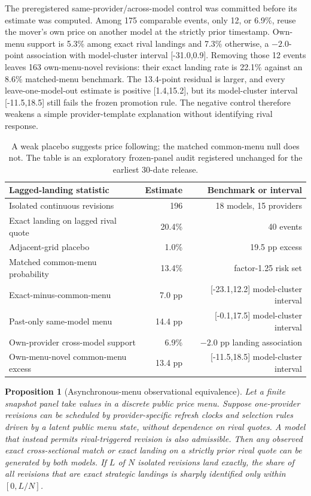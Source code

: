 \documentclass[11pt]{article}
\newcommand{\1}{\mathbf{1}}
\newtheorem{proposition}{Proposition}
\begin{document}
{The preregistered same-provider/across-model control was committed before its
estimate was computed.  Among 175 comparable events, only 12, or 6.9\%, reuse the
mover's own price on another model at the strictly prior timestamp.  Own-menu
support is 5.3\% among exact rival landings and 7.3\% otherwise, a $-2.0$-point
association with model-cluster interval [-31.0,0.9].  Removing those 12 events
leaves 163 own-menu-novel revisions: their exact landing rate is 22.1\% against an
8.6\% matched-menu benchmark.  The 13.4-point residual is larger, and every
leave-one-model-out estimate is positive [1.4,15.2], but its model-cluster interval
[-11.5,18.5] still fails the frozen promotion rule.  The negative control therefore
weakens a simple provider-template explanation without identifying rival response.

\begin{table}[H]
\centering
\small
\begin{tabular}{lrr}
\toprule
Lagged-landing statistic & Estimate & Benchmark or interval \\
\midrule
Isolated continuous revisions & 196 & 18 models, 15 providers \\
Exact landing on lagged rival quote & 20.4\% & 40 events \\
Adjacent-grid placebo & 1.0\% & 19.5 pp excess \\
Matched common-menu probability & 13.4\% & factor-1.25 risk set \\
Exact-minus-common-menu & 7.0 pp & [-23.1,12.2] model-cluster interval \\
Past-only same-model menu & 14.4 pp & [-0.1,17.5] model-cluster interval \\
Own-provider cross-model support & 6.9\% & $-2.0$ pp landing association \\
Own-menu-novel common-menu excess & 13.4 pp & [-11.5,18.5] model-cluster interval \\
\bottomrule
\end{tabular}
\caption{A weak placebo suggests price following; the matched common-menu null
does not.  The table is an exploratory frozen-panel audit registered unchanged
for the earliest 30-date release.}
\label{tab:laggedlanding}
\end{table}

\begin{proposition}[Asynchronous-menu observational equivalence]
\label{prop:menu-equivalence}
Let a finite snapshot panel take values in a discrete public price menu.  Suppose
one-provider revisions can be scheduled by provider-specific refresh clocks and
selection rules driven by a latent public menu state, without dependence on rival
quotes.  A model that instead permits rival-triggered revision is also admissible.
Then any observed exact cross-sectional match or exact landing on a strictly prior
rival quote can be generated by both models.  If $L$ of $N$ isolated revisions
land exactly, the share of all revisions that are exact strategic landings is
sharply identified only within $[0,L/N]$.
\end{proposition}

}
\end{document}
